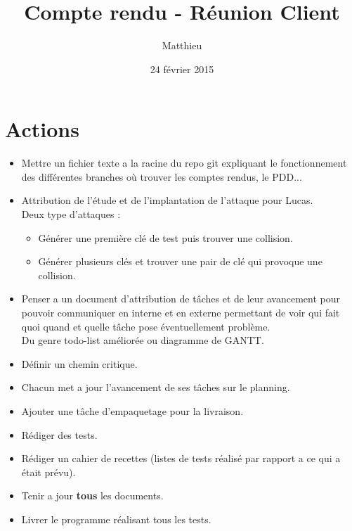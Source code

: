 \documentclass{CR-projet}
\title{Compte rendu - Réunion Client}
\author{Matthieu \bsc{FIN}}
\date{24 février 2015}
\begin{document}
\maketitle
\newpage

\newpage

\section{Actions}

\begin{itemize}
	\item Mettre un fichier texte a la racine du repo git expliquant le fonctionnement des différentes branches
	où trouver les comptes rendus, le PDD...
	\item Attribution de l'étude et de l'implantation de l'attaque pour Lucas.\\
	Deux type d'attaques :
	\begin{itemize}
		\item Générer une première clé de test puis trouver une collision.
		\item Générer plusieurs clés et trouver une pair de clé qui provoque une collision.
	\end{itemize}
	\item Penser a un document d'attribution de tâches et de leur avancement
	pour pouvoir communiquer en interne et en externe permettant de voir qui fait quoi quand et quelle tâche pose éventuellement problème.\\
	Du genre todo-list améliorée ou diagramme de GANTT.
	\item Définir un chemin critique.
	\item Chacun met a jour l'avancement de ses tâches sur le planning.
	\item Ajouter une tâche d'empaquetage pour la livraison.
	\item Rédiger des tests.
	\item Rédiger un cahier de recettes (listes de tests réalisé par rapport a ce qui a était prévu).
	\item Tenir a jour \textbf{tous} les documents.
	\item Livrer le programme réalisant tous les tests.
\end{itemize}
\end{document}
